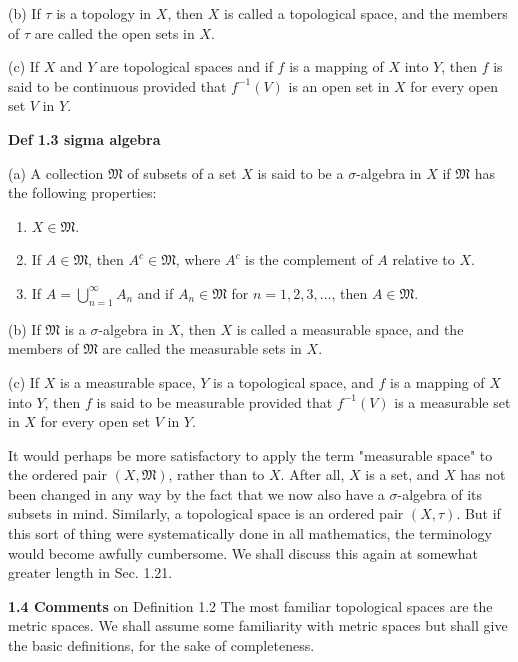 \documentclass[11pt]{article}
\begin{document}
(b) If \(\tau\) is a topology in \(X\), then \(X\) is called a topological space, and the members of \(\tau\) are called the open sets in \(X\).

(c) If \(X\) and \(Y\) are topological spaces and if \(f\) is a mapping of \(X\) into \(Y\), then \(f\) is said to be continuous provided that \(f^{-1}(V)\) is an open set in \(X\) for every open set \(V\) in \(Y\).

\medskip
\label{org880033d} \textbf{Def 1.3 sigma algebra}

(a) A collection \(\mathfrak{M}\) of subsets of a set \(X\) is said to be a \(\sigma\)-algebra in \(X\) if \(\mathfrak{M}\) has the following properties:

\begin{enumerate}
\item \(X \in \mathfrak{M}\).
\item If \(A \in \mathfrak{M}\), then \(A^c \in \mathfrak{M}\), where \(A^c\) is the complement of \(A\) relative to \(X\).
\item If \(A=\bigcup_{n=1}^{\infty} A_n\) and if \(A_n \in \mathfrak{M}\) for \(n=1,2,3, \dots\), then \(A \in \mathfrak{M}\).
\end{enumerate}

(b) If \(\mathfrak{M}\) is a \(\sigma\)-algebra in \(X\), then \(X\) is called a measurable space, and the members of \(\mathfrak{M}\) are called the measurable sets in \(X\).

(c) If \(X\) is a measurable space, \(Y\) is a topological space, and \(f\) is a mapping of \(X\) into \(Y\), then \(f\) is said to be measurable provided that \(f^{-1}(V)\) is a measurable set in \(X\) for every open set \(V\) in \(Y\).

It would perhaps be more satisfactory to apply the term "measurable space" to the ordered pair \((X, \mathfrak{M})\), rather than to \(X\). After all, \(X\) is a set, and \(X\) has not been changed in any way by the fact that we now also have a \(\sigma\)-algebra of its subsets in mind. Similarly, a topological space is an ordered pair \((X, \tau)\). But if this sort of thing were systematically done in all mathematics, the terminology would become awfully cumbersome. We shall discuss this again at somewhat greater length in Sec. 1.21.

\medskip
\textbf{1.4 Comments} on Definition 1.2 The most familiar topological spaces are the metric spaces. We shall assume some familiarity with metric spaces but shall give the basic definitions, for the sake of completeness.
\end{document}
